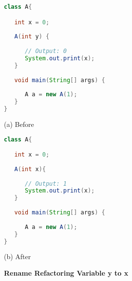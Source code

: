\begin{figure}[th]
\centering
\begin{minipage}[t]{0.47\linewidth}
\begin{lstlisting}[language=java, basicstyle=\scriptsize\ttfamily,frame=single]
class A{

   int x = 0;
	
   A(int y) {
	   
      // Output: 0
      System.out.print(x);
   }
	
   void main(String[] args) {
	
      A a = new A(1);
   }
}
\end{lstlisting}
\centering(a) Before 
\end{minipage}
\hfill
\begin{minipage}[t]{0.47\linewidth}
\begin{lstlisting}[language=java, basicstyle=\scriptsize\ttfamily,frame=single]
class A{

   int x = 0;
	
   A(int x){
	   
      // Output: 1
      System.out.print(x);
   }
	
   void main(String[] args) {
	
      A a = new A(1);
   }
}
\end{lstlisting}
\centering(b) After 
\end{minipage}
\caption{\textbf{Rename Refactoring Variable y to x }}
\label{figure:precond5_3}
\end{figure}


